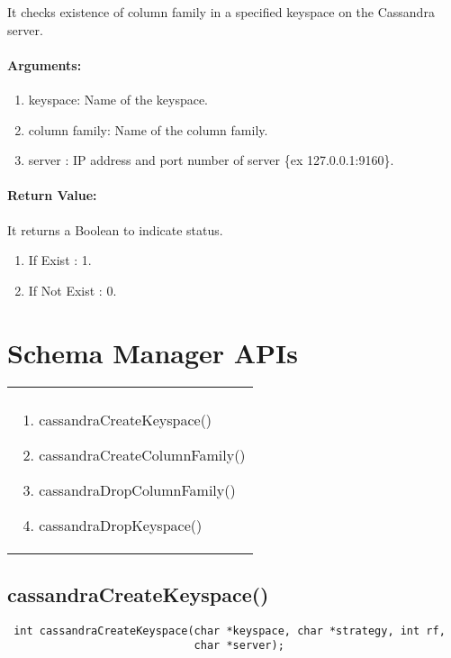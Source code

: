 \documentclass[12 pt , a4paper ]{report}
\begin{document}
   It checks existence of column family in a specified keyspace on the Cassandra server.

  \paragraph{Arguments:} 
	        \begin{enumerate}
		    \item keyspace: Name of the keyspace.
		    \item column family: Name of the column family.
		    \item server : IP address and port number of server \{ex 127.0.0.1:9160\}.
		\end{enumerate}
		
 \paragraph{Return Value:}
 It returns a Boolean to indicate status.
\begin{enumerate}
 \item If Exist : 1.
 \item If Not Exist   : 0.
\end{enumerate}



\section{Schema Manager APIs} 

\begin{tabular}{ p{7cm} }
 \cellcolor{blue!30}{\bf Schema Manager APIs}\\
  \cellcolor{blue!30}
\begin{enumerate}
   \item cassandraCreateKeyspace()
   \item cassandraCreateColumnFamily()
   \item cassandraDropColumnFamily()
   \item cassandraDropKeyspace()
   \end{enumerate} \\

\end{tabular}
\subsection{cassandraCreateKeyspace()}
\begin{verbatim}
 int cassandraCreateKeyspace(char *keyspace, char *strategy, int rf, 
                             char *server);
\end{verbatim}
\end{document}
